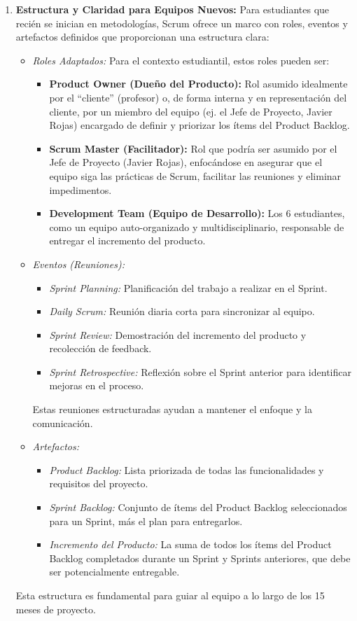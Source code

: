 \begin{enumerate}
    \item \textbf{Estructura y Claridad para Equipos Nuevos:}
    Para estudiantes que recién se inician en metodologías, Scrum ofrece un marco con roles, eventos y artefactos definidos que proporcionan una estructura clara:
    \begin{itemize}
        \item \textit{Roles Adaptados:} Para el contexto estudiantil, estos roles pueden ser:
        \begin{itemize}
            \item \textbf{Product Owner (Dueño del Producto):} Rol asumido idealmente por el ``cliente'' (profesor) o, de forma interna y en representación del cliente, por un miembro del equipo (ej. el Jefe de Proyecto, Javier Rojas) encargado de definir y priorizar los ítems del Product Backlog.
            \item \textbf{Scrum Master (Facilitador):} Rol que podría ser asumido por el Jefe de Proyecto (Javier Rojas), enfocándose en asegurar que el equipo siga las prácticas de Scrum, facilitar las reuniones y eliminar impedimentos.
            \item \textbf{Development Team (Equipo de Desarrollo):} Los 6 estudiantes, como un equipo auto-organizado y multidisciplinario, responsable de entregar el incremento del producto.
        \end{itemize}
        \item \textit{Eventos (Reuniones):}
        \begin{itemize}
            \item \textit{Sprint Planning:} Planificación del trabajo a realizar en el Sprint.
            \item \textit{Daily Scrum:} Reunión diaria corta para sincronizar al equipo.
            \item \textit{Sprint Review:} Demostración del incremento del producto y recolección de feedback.
            \item \textit{Sprint Retrospective:} Reflexión sobre el Sprint anterior para identificar mejoras en el proceso.
        \end{itemize}
        Estas reuniones estructuradas ayudan a mantener el enfoque y la comunicación.
        \item \textit{Artefactos:}
        \begin{itemize}
            \item \textit{Product Backlog:} Lista priorizada de todas las funcionalidades y requisitos del proyecto.
            \item \textit{Sprint Backlog:} Conjunto de ítems del Product Backlog seleccionados para un Sprint, más el plan para entregarlos.
            \item \textit{Incremento del Producto:} La suma de todos los ítems del Product Backlog completados durante un Sprint y Sprints anteriores, que debe ser potencialmente entregable.
        \end{itemize}
    \end{itemize}
    Esta estructura es fundamental para guiar al equipo a lo largo de los 15 meses de proyecto.


\end{enumerate}
